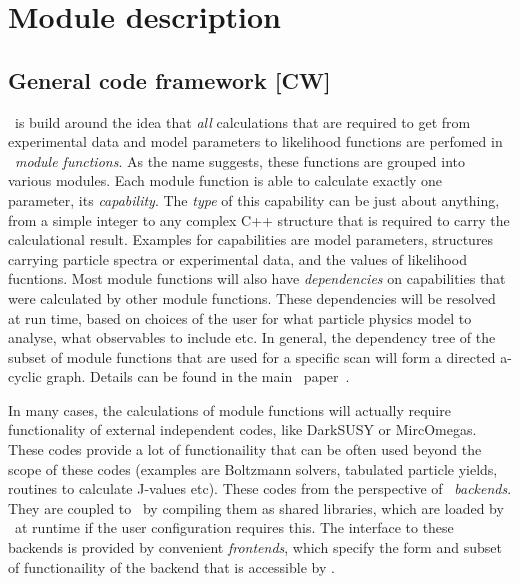 \section{Module description}
\label{code}


\subsection{General code framework {\bf [CW]}}
\label{code_gen}


\GB\ is build around the idea that \emph{all} calculations that are required to
get from experimental data and model parameters to likelihood functions are
perfomed in \GB\ \emph{module functions}.  As the name suggests, these
functions are grouped into various modules.  Each module function is able to
calculate exactly one parameter, its \emph{capability}.  The \emph{type} of
this capability can be just about anything, from a simple integer to any
complex C++ structure that is required to carry the calculational result.
Examples for capabilities are model parameters, structures carrying particle
spectra or experimental data, and the values of likelihood fucntions.  Most
module functions will also have \emph{dependencies} on capabilities that were
calculated by other module functions.  These dependencies will be resolved at
run time, based on choices of the user for what particle physics model to
analyse, what observables to include etc.  In general, the dependency tree of
the subset of module functions that are used for a specific scan will form a
directed a-cyclic graph.  Details can be found in the main \GB\
paper~\cite{123}.

In many cases, the calculations of module functions will actually require
functionality of external independent codes, like DarkSUSY or MircOmegas.
These codes provide a lot of functionaility that can be often used beyond the
scope of these codes (examples are Boltzmann solvers, tabulated particle
yields, routines to calculate J-values etc).  These codes from the perspective
of \GB\ \emph{backends}.  They are coupled to \GB\ by compiling them as shared
libraries, which are loaded by \GB\ at runtime if the user configuration
requires this.  The interface to these backends is provided by convenient
\emph{frontends}, which specify the form and subset of functionaility of the
backend that is accessible by \GB.

